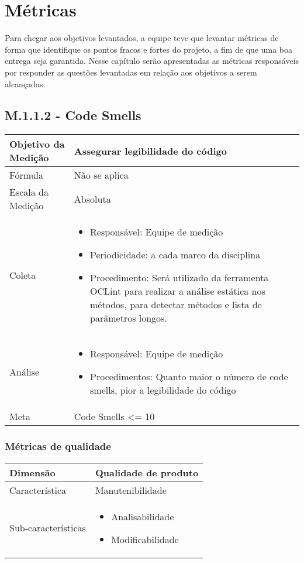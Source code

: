 \chapter{Métricas}
	
	Para chegar aos objetivos levantados, a equipe teve que levantar métricas de forma que identifique os pontos fracos e fortes do projeto, a fim de que uma boa entrega seja garantida.
	Nesse capítulo serão apresentadas as métricas responsáveis por responder as questões levantadas em relação aos objetivos a serem alcançadas.

\section{M.1.1.2 - Code Smells} %

	\begin{tabular}{ |p{4cm}|p{8cm}|  }
	 \hline
	 Objetivo da Medição 		& 	 Assegurar legibilidade do código  \\
	 \hline
	 Fórmula		& 	Não se aplica	\\
	 \hline
	 Escala da Medição 		& 	Absoluta	 \\
	 \hline
	 Coleta		& 	\begin{itemize} \item Responsável: Equipe de medição \item Periodicidade: a cada marco da disciplina \item Procedimento: Será utilizado da ferramenta OCLint para realizar a análise estática nos métodos, para detectar métodos e lista de parâmetros longos. \end{itemize} \\
	 \hline
	 Análise		& 	\begin{itemize} \item Responsável: Equipe de medição \item Procedimentos: Quanto maior o número de code smells, pior a legibilidade do código \end{itemize} 	 \\
	 \hline
	 Meta		& 	Code Smells <= 10	 \\
	 \hline
	\end{tabular}

	\subsection{Métricas de qualidade}

	\begin{tabular}{ |p{4cm}|p{8cm}| }
	\hline
	  Dimensão 		& 	Qualidade de produto	 \\
	 \hline
	 Característica 		& 	Manutenibilidade	 \\
	 \hline
	 Sub-características 		& 	\begin{itemize}	\item Analisabilidade \item Modificabilidade \end{itemize} \\
	 \hline
	\end{tabular}


